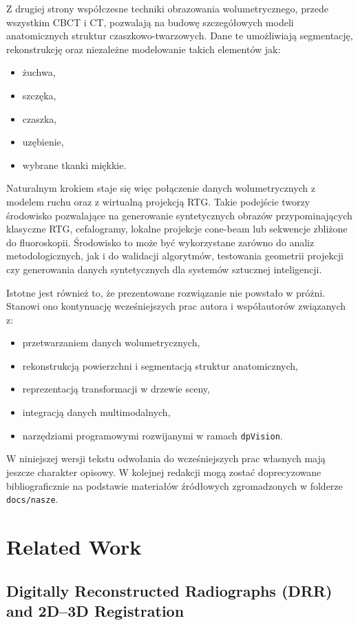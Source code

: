 \documentclass[11pt,a4paper]{article}
\begin{document}
Z drugiej strony współczesne techniki obrazowania wolumetrycznego, przede wszystkim
CBCT i CT, pozwalają na budowę szczegółowych modeli anatomicznych struktur
czaszkowo-twarzowych. Dane te umożliwiają segmentację, rekonstrukcję oraz niezależne
modelowanie takich elementów jak:
\begin{itemize}
\item żuchwa,
\item szczęka,
\item czaszka,
\item uzębienie,
\item wybrane tkanki miękkie.
\end{itemize}

Naturalnym krokiem staje się więc połączenie danych wolumetrycznych z modelem ruchu
oraz z wirtualną projekcją RTG. Takie podejście tworzy środowisko pozwalające
na generowanie syntetycznych obrazów przypominających klasyczne RTG, cefalogramy,
lokalne projekcje cone-beam lub sekwencje zbliżone do fluoroskopii. Środowisko to
może być wykorzystane zarówno do analiz metodologicznych, jak i do walidacji
algorytmów, testowania geometrii projekcji czy generowania danych syntetycznych
dla systemów sztucznej inteligencji.

Istotne jest również to, że prezentowane rozwiązanie nie powstało w próżni.
Stanowi ono kontynuację wcześniejszych prac autora i współautorów związanych z:
\begin{itemize}
\item przetwarzaniem danych wolumetrycznych,
\item rekonstrukcją powierzchni i segmentacją struktur anatomicznych,
\item reprezentacją transformacji w drzewie sceny,
\item integracją danych multimodalnych,
\item narzędziami programowymi rozwijanymi w ramach \texttt{dpVision}.
\end{itemize}

W niniejszej wersji tekstu odwołania do wcześniejszych prac własnych mają jeszcze
charakter opisowy. W kolejnej redakcji mogą zostać doprecyzowane bibliograficznie
na podstawie materiałów źródłowych zgromadzonych w folderze \texttt{docs/nasze}.

\section{Related Work}

\subsection{Digitally Reconstructed Radiographs (DRR) and 2D--3D Registration}
\end{document}
